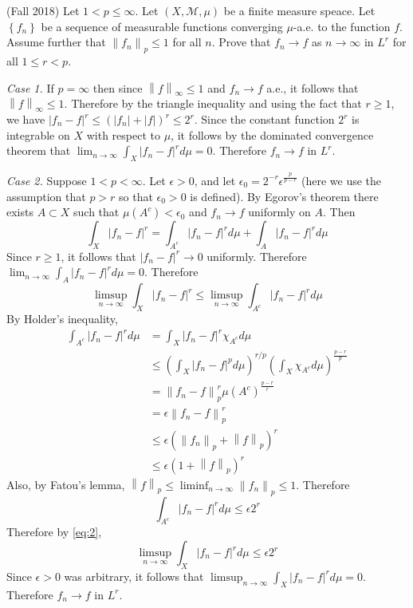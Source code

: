 \documentclass[answers]{exam}
\theoremstyle{problemstyle}
\newcommand{\norm}[1]{\left\lVert#1\right\rVert} %
\newcommand{\1}[1]{\textbf{1}_{\left[#1\right]}} %
\begin{document}
\begin{questions}
\question (Fall 2018)
  Let $1<p\leq \infty$. Let $(X,\mathcal{M},\mu)$ be a finite measure speace. Let $\left\{ f_{n} \right\}$ be a sequence of measurable functions converging $\mu$-a.e. to the function $f$. Assume further that $\norm{f_{n}}_{p}\leq 1$ for all $n$. Prove that $f_{n}\to f$ as $n\to \infty$ in $L^{r}$ for all $1\leq r<p$.
\begin{solution}
  \textit{Case 1.} If $p=\infty$ then since $\norm{f}_{\infty}\leq 1$ and $f_{n}\to f$ a.e., it follows that $\norm{f}_{\infty}\leq 1$. Therefore by the triangle inequality and using the fact that $r\geq 1$, we have $|f_{n}-f|^{r}\leq (|f_{n}| + |f| )^{r}\leq 2^{r}$. Since the constant function $2^{r}$ is integrable on $X$ with respect to $\mu$, it follows by the dominated convergence theorem that $\lim_{n\to\infty}\int_{X} |f_{n}-f|^{r}d\mu = 0$. Therefore $f_{n}\to f$ in $L^{r}$.

  \textit{Case 2.} Suppose $1<p<\infty$. Let $\epsilon>0$, and let $\epsilon_{0} = 2^{-r} \epsilon^{\frac{p}{p-r}}$ (here we use the assumption that $p>r$ so that $\epsilon_{0}>0$ is defined). By Egorov's theorem there exists $A\subset X$ such that $\mu(A^{c})<\epsilon_{0}$ and $f_{n}\to f$ uniformly on $A$. Then
  \begin{equation*}
    \int_{X} |f_{n}-f|^{r} = \int_{A^{c}}|f_{n}-f|^{r}d\mu + \int_{A}|f_{n}-f|^{r}d\mu
  \end{equation*}
  Since $r\geq 1$, it follows that $|f_{n}-f|^{r}\to 0$ uniformly. Therefore $\lim_{n\to\infty }\int_{A}|f_{n}-f|^{r}d\mu =0$. Therefore
  \begin{equation}\label{eq:2}
    \limsup_{n\to\infty} \int_{X} |f_{n}-f|^{r} \leq \limsup_{n\to\infty} \int_{A^{c}}|f_{n}-f|^{r}d\mu
  \end{equation}
  By Holder's inequality,
  \begin{align*}
    \int_{A^{c}}|f_{n}-f|^{r}d\mu
    &= \int_{X} |f_{n}-f|^{r}\chi_{A^{c}} d\mu\\
    &\leq \left( \int_{X}|f_{n}-f|^{p} d\mu\right)^{r/p}\left( \int_{X}\chi_{A^{c}}d\mu  \right)^{\frac{p-r}{p}}\\
    &= \norm{f_{n}-f}_{p}^{r}\mu(A^{c})^{\frac{p-r}{r}}\\
    &= \epsilon\norm{f_{n}-f}_{p}^{r}\\
    &\leq \epsilon ( \norm{f_{n}}_{p}+ \norm{f}_{p})^{r}\\
    &\leq \epsilon \left( 1 + \norm{f}_{p} \right)^{r}
  \end{align*}
  Also, by Fatou's lemma, $\norm{f}_{p}\leq \liminf_{n\to\infty} \norm{f_{n}}_{p}\leq 1$. Therefore
  \begin{equation*}
    \int_{A^{c}} | f_{n}-f|^{r}d\mu \leq \epsilon 2^{r}
  \end{equation*}
  Therefore by \eqref{eq:2},
  \begin{equation*}
     \limsup_{n\to\infty} \int_{X} |f_{n}-f|^{r}d\mu  \leq \epsilon 2^{r}
   \end{equation*}
   Since $\epsilon>0$ was arbitrary, it follows that $\limsup_{n\to\infty} \int_{X} |f_{n}-f|^{r}d\mu=0$. Therefore $f_{n}\to f$ in $L^{r}$.
\end{solution}


\end{questions}
\end{document}
